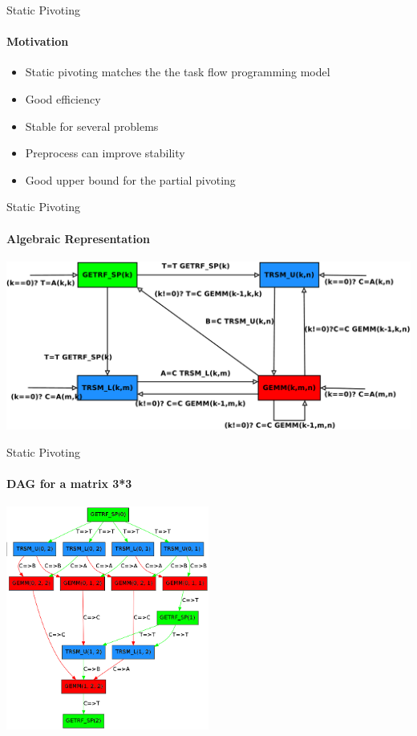 \begin{frame}{Static Pivoting}
\framesubtitle{Motivation}
\begin{itemize}
\item Static pivoting matches the the task flow programming model
\item Good efficiency
\item Stable for several problems
\item Preprocess can improve stability
\item Good upper bound for the partial pivoting
\end{itemize}
\end{frame}

\begin{frame}{Static Pivoting}
\framesubtitle{Algebraic Representation}
\begin{center}
\includegraphics[scale=0.2]{dag_getrf_sp.pdf} 
\end{center}
\end{frame}

\begin{frame}{Static Pivoting}
\framesubtitle{DAG for a matrix 3*3}
\begin{center}
\includegraphics[width=0.5\textwidth]{dag33.png} 
\end{center}
\end{frame}
